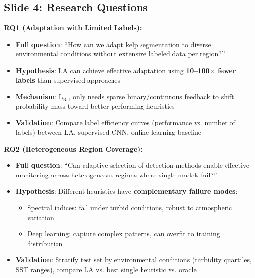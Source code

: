 \documentclass[11pt]{article}
\begin{document}
\subsection{Slide 4: Research Questions}

\textbf{RQ1 (Adaptation with Limited Labels):}
\begin{itemize}
    \item \textbf{Full question}: ``How can we adapt kelp segmentation to diverse environmental conditions without extensive labeled data per region?''
    \item \textbf{Hypothesis}: LA can achieve effective adaptation using \textbf{10--100$\times$ fewer labels} than supervised approaches
    \item \textbf{Mechanism}: L$_{\text{R-I}}$ only needs sparse binary/continuous feedback to shift probability mass toward better-performing heuristics
    \item \textbf{Validation}: Compare label efficiency curves (performance vs. number of labels) between LA, supervised CNN, online learning baseline
\end{itemize}

\textbf{RQ2 (Heterogeneous Region Coverage):}
\begin{itemize}
    \item \textbf{Full question}: ``Can adaptive selection of detection methods enable effective monitoring across heterogeneous regions where single models fail?''
    \item \textbf{Hypothesis}: Different heuristics have \textbf{complementary failure modes}:
    \begin{itemize}
        \item Spectral indices: fail under turbid conditions, robust to atmospheric variation
        \item Deep learning: capture complex patterns, can overfit to training distribution
    \end{itemize}
    \item \textbf{Validation}: Stratify test set by environmental conditions (turbidity quartiles, SST ranges), compare LA vs. best single heuristic vs. oracle
\end{itemize}
\end{document}
